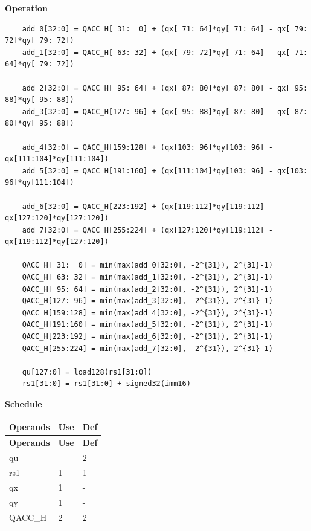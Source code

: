 \textbf{Operation}\\
\begin{lstlisting}
    add_0[32:0] = QACC_H[ 31:  0] + (qx[ 71: 64]*qy[ 71: 64] - qx[ 79: 72]*qy[ 79: 72])
    add_1[32:0] = QACC_H[ 63: 32] + (qx[ 79: 72]*qy[ 71: 64] - qx[ 71: 64]*qy[ 79: 72])

    add_2[32:0] = QACC_H[ 95: 64] + (qx[ 87: 80]*qy[ 87: 80] - qx[ 95: 88]*qy[ 95: 88])
    add_3[32:0] = QACC_H[127: 96] + (qx[ 95: 88]*qy[ 87: 80] - qx[ 87: 80]*qy[ 95: 88])

    add_4[32:0] = QACC_H[159:128] + (qx[103: 96]*qy[103: 96] - qx[111:104]*qy[111:104])
    add_5[32:0] = QACC_H[191:160] + (qx[111:104]*qy[103: 96] - qx[103: 96]*qy[111:104])

    add_6[32:0] = QACC_H[223:192] + (qx[119:112]*qy[119:112] - qx[127:120]*qy[127:120])
    add_7[32:0] = QACC_H[255:224] + (qx[127:120]*qy[119:112] - qx[119:112]*qy[127:120])

    QACC_H[ 31:  0] = min(max(add_0[32:0], -2^{31}), 2^{31}-1)
    QACC_H[ 63: 32] = min(max(add_1[32:0], -2^{31}), 2^{31}-1)
    QACC_H[ 95: 64] = min(max(add_2[32:0], -2^{31}), 2^{31}-1)
    QACC_H[127: 96] = min(max(add_3[32:0], -2^{31}), 2^{31}-1)
    QACC_H[159:128] = min(max(add_4[32:0], -2^{31}), 2^{31}-1)
    QACC_H[191:160] = min(max(add_5[32:0], -2^{31}), 2^{31}-1)
    QACC_H[223:192] = min(max(add_6[32:0], -2^{31}), 2^{31}-1)
    QACC_H[255:224] = min(max(add_7[32:0], -2^{31}), 2^{31}-1)

    qu[127:0] = load128(rs1[31:0])
    rs1[31:0] = rs1[31:0] + signed32(imm16)
\end{lstlisting}

\textbf{Schedule}\\
\begin{longtable}[c]{|l|l|l|}
    \hline
    \rowcolor{lightgray}
    \textbf{Operands} & \textbf{Use} & \textbf{Def} \\\hline
    \endfirsthead
    \hline
    \rowcolor{lightgray}
     \textbf{Operands} & \textbf{Use} & \textbf{Def} \\\hline
    \endhead
    \hline
    \endfoot

    qu & - & 2 \\\hline
    rs1 & 1 & 1 \\\hline
     qx & 1 & - \\\hline
     qy & 1 & - \\\hline
     QACC\_H & 2 & 2

\end{longtable}

